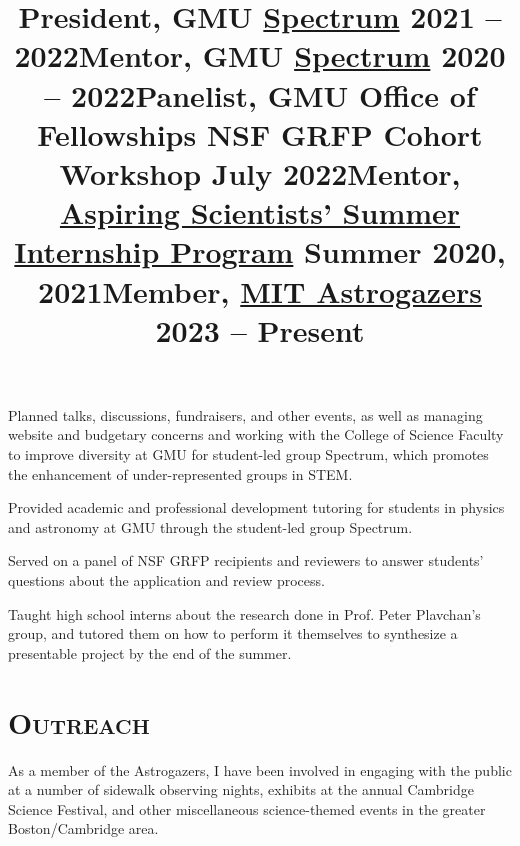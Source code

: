 \documentclass[marg, centered]{res}
\begin{document}
\begin{resume}
\title{\textbf{President}, GMU \href{https://gmuspectrum.squarespace.com/}{\color{dkbu} Spectrum} \hfill \textbf{2021 -- 2022}}
\begin{position}
{\small Planned talks, discussions, fundraisers, and other events, as well as managing website and budgetary concerns and working with the College of Science Faculty to improve diversity at GMU for student-led group Spectrum, which promotes the enhancement of under-represented groups in STEM.}
\end{position}

\title{\textbf{Mentor}, GMU \href{https://gmuspectrum.squarespace.com/}{\color{dkbu} Spectrum} \hfill \textbf{2020 -- 2022}}
\begin{position}
{\small Provided academic and professional development tutoring for students in physics and astronomy at GMU through the student-led group Spectrum.}
\end{position}

\title{\textbf{Panelist}, GMU Office of Fellowships NSF GRFP Cohort Workshop \hfill \textbf{July 2022}}
\begin{position}
{\small Served on a panel of NSF GRFP recipients and reviewers to answer students' questions about the application and review process.}
\end{position}

\title{\textbf{Mentor}, \href{https://science.gmu.edu/assip}{\color{dkbu} Aspiring Scientists' Summer Internship Program} \hfill \textbf{Summer 2020, 2021}}
\begin{position}
{\small Taught high school interns about the research done in Prof. Peter Plavchan's group, and tutored them on how to perform it themselves to synthesize a presentable project by the end of the summer.}
\end{position}


\section{{\scshape \bfseries Outreach}}

\title{\textbf{Member}, \href{https://astrogazers.mit.edu/}{\color{dkbu} MIT Astrogazers} \hfill \textbf{2023 -- Present}}
\begin{position}
{\small As a member of the Astrogazers, I have been involved in engaging with the public at a number of sidewalk observing nights, exhibits at the annual Cambridge Science Festival, and other miscellaneous science-themed events in the greater Boston/Cambridge area.}
\end{position}


\end{resume}
\end{document}

